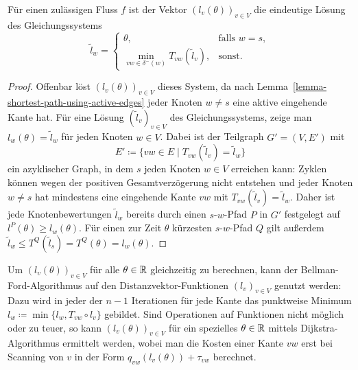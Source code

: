 \begin{proposition}\label{prop-arrival-times-vector}
	Für einen zulässigen Fluss $f$ ist der Vektor $(l_v(\theta))_{v\in V}$ die eindeutige Lösung des Gleichungssystems
	\[ \tilde{l}_w = \begin{cases}
	\theta, & \text{falls } w=s, \\
	\min\limits_{vw\in \delta^-(w)} T_{vw}(\tilde{l}_v), & \text{sonst}.
	\end{cases} \]
\end{proposition}
\begin{proof}
	Offenbar löst $(l_v(\theta))_{v\in V}$ dieses System, da nach Lemma~\ref{lemma-shortest-path-using-active-edges} jeder Knoten $w\neq s$ eine aktive eingehende Kante hat.
	Für eine Lösung $(\tilde{l}_v)_{v\in V}$ des Gleichungssystems, zeige man $l_w(\theta) = \tilde{l}_w$ für jeden Knoten $w\in V$.
	Dabei ist der Teilgraph $G'=(V, E')$ mit
	\[ E' \coloneq  \{ vw \in E \mid T_{vw}(\tilde{l}_v ) = \tilde{l}_w \} \]
	ein azyklischer Graph, in dem $s$ jeden Knoten $w\in V$ erreichen kann:
	Zyklen können wegen der positiven Gesamtverzögerung nicht entstehen und jeder Knoten $w\neq s$ hat mindestens eine eingehende Kante $vw$ mit $T_{vw}(\tilde{l}_v) = \tilde{l}_w$.
	Daher ist jede Knotenbewertungen $\tilde{l}_w$ bereits durch einen $s$-$w$-Pfad $P$ in $G'$ festgelegt auf $l^P(\theta)\geq l_w(\theta)$.
	Für einen zur Zeit $\theta$ kürzesten $s$-$w$-Pfad $Q$ gilt außerdem $\tilde{l}_w \leq T^Q(\tilde{l}_s) = T^Q(\theta) = l_w(\theta)$.
\end{proof}

Um $(l_v(\theta))_{v\in V}$ für alle $\theta\in\mathbb{R}$ gleichzeitig zu berechnen, kann der Bellman-Ford-Algorithmus auf den Distanzvektor-Funktionen $(l_v)_{v\in V}$ genutzt werden:
Dazu wird in jeder der $n-1$ Iterationen für jede Kante das punktweise Minimum $l_w \coloneq  \min\{ l_w, T_{vw}\circ l_v \}$ gebildet.
Sind Operationen auf Funktionen nicht möglich oder zu teuer, so kann $(l_v(\theta))_{v\in V}$ für ein spezielles $\theta\in\mathbb{R}$ mittels Dijkstra-Algorithmus ermittelt werden, wobei man die Kosten einer Kante $vw$ erst bei Scanning von $v$ in der Form $q_{vw}(l_v(\theta)) + \tau_{vw}$ berechnet.